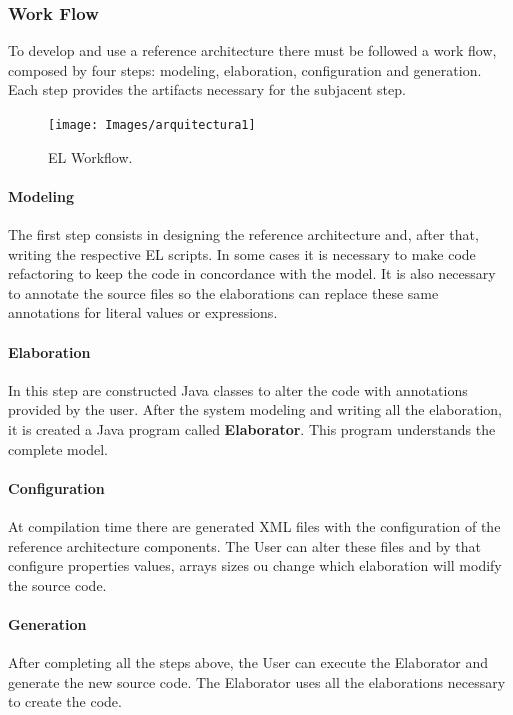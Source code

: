\documentclass{report}
\begin{document}
			\subsubsection{Work Flow}
		
			\par To develop and use a reference architecture there must be followed a work flow, composed by four steps: modeling, elaboration, configuration and generation. Each step provides the artifacts necessary for the subjacent step.
			
			\begin{figure} [h]
				\centering
				\texttt{[image: Images/arquitectura1]}
				\caption{EL Workflow.}
				\label{fig:workflow}
			\end{figure}
		
			\paragraph{Modeling} The first step consists in designing the reference architecture and, after that, writing the respective EL scripts. In some cases it is necessary to make code refactoring to keep the code in concordance with the model. It is also necessary to annotate the source files so the elaborations can replace these same annotations for literal values or expressions.

			\paragraph{Elaboration} In this step are constructed Java classes to alter the code with annotations provided by the user. After the system modeling and writing all the elaboration, it is created a Java program called \textbf{Elaborator}. This program understands the complete model.

			\paragraph{Configuration} At compilation time there are generated XML files with the configuration of the reference architecture components. The User can alter these files and by that configure properties values, arrays sizes ou change which elaboration will modify the source code.

			\paragraph{Generation} After completing all the steps above, the User can execute the Elaborator and generate the new source code. The Elaborator uses all the elaborations necessary to create the code.
			
\end{document}
